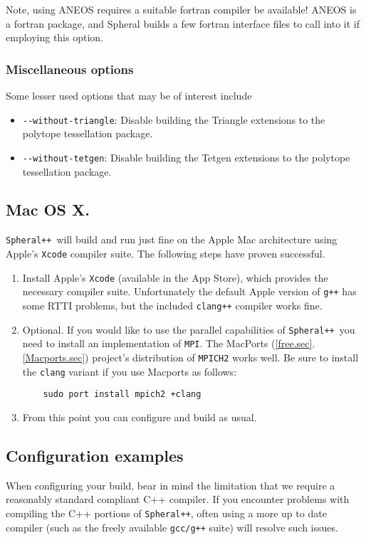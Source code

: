 \documentclass{article}
\newcommand{\Spheral}{{\tt Spheral++}}
\begin{document}
Note, using ANEOS requires a suitable fortran compiler be available!  ANEOS is a fortran package, and Spheral builds a few fortran interface files to call into it if employing this option.

\subsubsection{Miscellaneous options}
Some lesser used options that may be of interest include
\begin{itemize}
\item \verb+--without-triangle+: Disable building the Triangle extensions to the polytope tessellation package.
\item \verb+--without-tetgen+: Disable building the Tetgen extensions to the polytope tessellation package.
\end{itemize}

\subsection{Mac OS X.}
\Spheral\ will build and run just fine on the Apple Mac architecture using Apple's \verb+Xcode+ compiler suite.  The following steps have proven successful.
\begin{enumerate}
\item Install Apple's \verb+Xcode+ (available in the App Store), which provides the necessary compiler suite.  Unfortunately the default Apple version of \verb.g++. has some RTTI problems, but the included \verb.clang++. compiler works fine.
\item Optional.  If you would like to use the parallel capabilities of \Spheral\ you need to install an implementation of \verb.MPI..  The MacPorts (\ref{free.sec}.\ref{Macports.sec}) project's distribution of \verb.MPICH2. works well.  Be sure to install the \verb.clang. variant if you use Macports as follows:
\begin{verbatim}
    sudo port install mpich2 +clang
\end{verbatim}
\item From this point you can configure and build as usual.
\end{enumerate}

\subsection{Configuration examples}
When configuring your build, bear in mind the limitation that we require a reasonably standard compliant C++ compiler.  If you encounter problems with compiling the C++ portions of \Spheral, often using a more up to date compiler (such as the freely available \verb.gcc/g++. suite) will resolve such issues.
\end{document}
